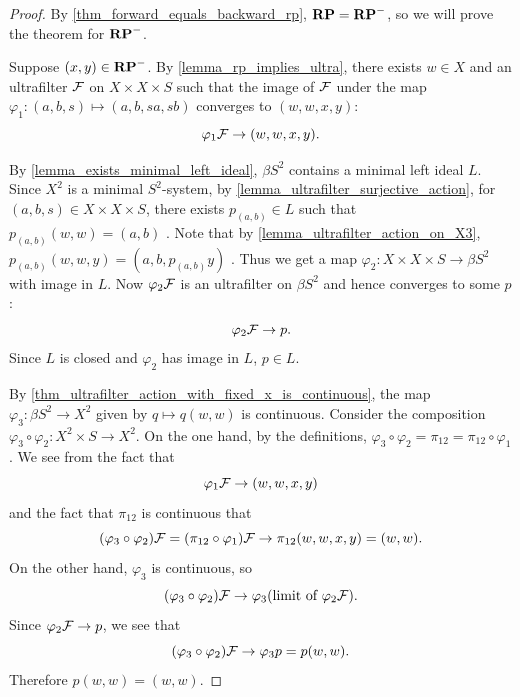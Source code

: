 \begin{proof}
    By \cref{thm_forward_equals_backward_rp}, $\mathbf{RP} = \mathbf{RP}^-$, so we will prove the theorem for $\mathbf{RP}^-$.
    
    Suppose $(x,y) \in \mathbf{RP}^-$. By \cref{lemma_rp_implies_ultra}, there exists $w \in X$ and an ultrafilter $\mathcal{F}$ on $X \times X \times S$ such that the image of $\mathcal{F}$ under the map $\varphi_1: (a,b,s) \mapsto (a,b,sa,sb)$  converges to $(w,w,x,y)$:
    \[\varphi_1 \mathcal{F} \to (w,w,x,y).\]

    By \cref{lemma_exists_minimal_left_ideal}, $\beta S^2$ contains a minimal left ideal $L$.  Since $X^2$ is a minimal $S^2$-system, by \cref{lemma_ultrafilter_surjective_action}, for $(a,b,s) \in X \times X \times S$, there exists $p_{(a,b)} \in L$ such that $p_{(a,b)}(w,w) = (a,b)$ .  Note that by \cref{lemma_ultrafilter_action_on_X3}, $p_{(a,b)} (w,w,y) = (a, b, p_{(a,b)} y)$ . Thus we get a map $\varphi_2: X \times X \times S \to \beta S^2$ with image in $L$. Now $\varphi_2 \mathcal{F}$ is an ultrafilter on $\beta S^2$ and hence converges to some $p$:
    \[\varphi_2 \mathcal{F} \to p.\]
    Since $L$ is closed and $\varphi_2$ has image in $L$, $p \in L$.
    
    By \cref{thm_ultrafilter_action_with_fixed_x_is_continuous}, the map $\varphi_3: \beta S^2 \to X^2$ given by $q \mapsto q(w,w)$  is continuous. Consider the composition $\varphi_3 \circ \varphi_2: X^2 \times S \to X^2$.  On the one hand, by the definitions, $\varphi_3 \circ \varphi_2 = \pi_{12} = \pi_{12} \circ \varphi_1$. We see from the fact that
    \[\varphi_1 \mathcal{F} \to (w,w,x,y)\]
    and the fact that $\pi_{12}$ is continuous that
    \[(\varphi_3 \circ \varphi_2) \mathcal{F} = (\pi_{12} \circ \varphi_1) \mathcal{F} \to \pi_{12} (w,w,x,y) = (w,w).\]
    On the other hand, $\varphi_3$ is continuous, so
    \[(\varphi_3 \circ \varphi_2) \mathcal{F} \to \varphi_3 (\text{limit of } \varphi_2 \mathcal{F}).\]
    Since $\varphi_2 \mathcal{F} \to p$, we see that
    \[(\varphi_3 \circ \varphi_2) \mathcal{F} \to \varphi_3 p = p(w,w).\]
    Therefore $p(w,w) = (w,w)$.


\end{proof}
